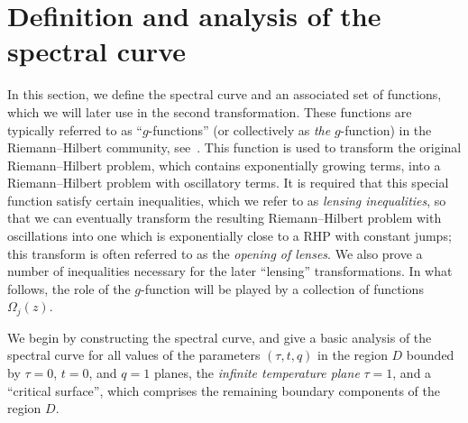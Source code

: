 \documentclass[10pt,a4paper]{amsart}
\numberwithin{equation}{section}
\begin{document}
\section{Definition and analysis of the spectral curve}\label{section3}
In this section, we define the spectral curve and an associated set of functions, which we will later use in the second
transformation. These functions are typically referred to as ``$g$-functions'' (or collectively as \textit{the} $g$-function) in the Riemann--Hilbert community, see~\cite{DKMVZ}. This function is used to transform the original Riemann--Hilbert problem, which contains exponentially growing terms, into a Riemann--Hilbert problem with oscillatory terms. It is required that this special function satisfy certain inequalities, which we refer to as \textit{lensing inequalities}, so that we can eventually transform the resulting Riemann--Hilbert problem with oscillations
into one which is exponentially close to a RHP with constant jumps; this transform is often referred to as the \textit{opening of lenses}. We also prove a number of inequalities necessary for the later ``lensing'' transformations. In what follows, the role of the $g$-function will be
played by a collection of functions $\Omega_j(z)$.

We begin by constructing the spectral curve, and give a basic analysis of the spectral curve for
all values of the parameters $(\tau,t,q)$ in the region $D$ bounded by $\tau=0$, $t=0$, and $q=1$ planes, the \textit{infinite temperature plane} $\tau =1$, and a ``critical surface'', which comprises the remaining boundary components of the region $D$.
\end{document}
